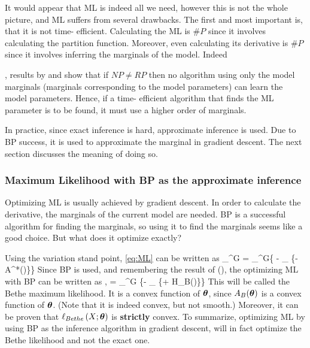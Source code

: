 It would appear that ML is indeed all we need, however this is not the whole picture,
and ML suffers from several drawbacks.
The first and most important is, that it is not time- efficient.
Calculating the ML is $\#P$ since it involves calculating the partition function.
Moreover, even calculating its derivative is $\#P$ since it involves inferring the marginals of the model.
Indeed , results by \cite{bresler2014hardness} and \cite{montanari2015computational} show that if $NP \neq RP$ then no algorithm using only the model marginals (marginals corresponding to the model parameters) can learn the model parameters. 
Hence, if a time- efficient algorithm that finds the ML parameter is to be found, it must use a higher order of marginals.

In practice, since exact inference is hard, approximate inference is used.
Due to BP success, it is used to approximate the marginal in gradient descent.
The next section discusses the meaning of doing so.
\subsubsection{Maximum Likelihood with BP as the approximate inference}
\label{sec:Bethe_ML}
Optimizing ML is usually achieved by gradient descent.
In order to calculate the derivative, the marginals of the current model are needed.
BP is a successful algorithm for finding the marginals,
so using it to find the marginals seems like a good choice.
But what does it optimize exactly?

Using the variation stand point, \eqref{eq:ML} can be written as
\be
\sup_{\thetav \in \Omega^G}  = \sup_{\thetav \in \Omega^G}\left\{ \mubv \cdot \thetav - \sup_{\muv \in \margpoly} \left\{\muv \cdot \thetav - A^*(\muv)\right\}\right\}
\ee
Since BP is used, and remembering the result of \cite{yedidia2000generalized}(), the optimizing ML with BP can be written as ,
\be
\label{eq:bethe_like}
  = \sup_{\thetav \in \Omega^G} \left\{\mubv \cdot \thetav - \sup_{\tauv \in \lclmargpoly} \left\{\tauv \cdot \thetav + H_B(\tauv)\right\}\right\}
\ee
This will be called the Bethe maximum likelihood.
It is a convex function of $\boldsymbol{\theta}$, since $A_B(\boldsymbol{\theta})$ is a convex function of $\boldsymbol{\theta}$. (Note that it is indeed convex, but not smooth.)
Moreover, it can be proven that $\ell_{Bethe}\left(X; \boldsymbol{\theta}\right)$ is \textbf{strictly} convex. %
To summarize, optimizing ML by using BP as the inference algorithm in gradient descent, will in fact optimize the Bethe likelihood and not the exact one.

